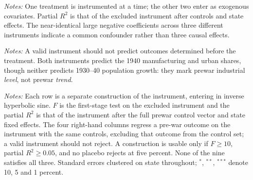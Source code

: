 \documentclass[12pt]{article}
\newcommand{\fittab}[1]{%
  \sbox{\tabbox}{#1}%
  \ifdim\wd\tabbox>\textwidth
    \resizebox{\textwidth}{!}{\usebox{\tabbox}}%
  \else\usebox{\tabbox}\fi}
\begin{document}
\begin{table}[p]
\centering
\caption{Single-endogenous IV estimates against OLS}
\label{tab:iv}
\fittab{}
\vspace{2pt}
\begin{minipage}{\textwidth}\footnotesize \textit{Notes:} One treatment is instrumented at a time; the other two enter as exogenous covariates. Partial $R^2$ is that of the excluded instrument after controls and state effects. The near-identical large negative coefficients across three different instruments indicate a common confounder rather than three causal effects.\end{minipage}
\end{table}

\begin{table}[p]
\centering
\caption{Exclusion-restriction placebo: instruments against pre-war outcomes}
\label{tab:ivplacebo}
\fittab{}
\vspace{2pt}
\begin{minipage}{\textwidth}\footnotesize \textit{Notes:} A valid instrument should not predict outcomes determined before the treatment. Both instruments predict the 1940 manufacturing and urban shares, though neither predicts 1930--40 population growth: they mark prewar industrial \emph{level}, not prewar \emph{trend}.\end{minipage}
\end{table}

\begin{table}[p]
\centering
\caption{Every construction of the 1938 instrument, relevance against exclusion}
\label{tab:impspecs}
\fittab{}
\vspace{2pt}
\begin{minipage}{\textwidth}\footnotesize \textit{Notes:} Each row is a
separate construction of the instrument, entering in inverse hyperbolic sine.
$F$ is the first-stage test on the excluded instrument and the partial $R^2$ is
that of the instrument after the full prewar control vector and state fixed
effects. The four right-hand columns regress a pre-war outcome on the
instrument with the same controls, excluding that outcome from the control set;
a valid instrument should not reject. A construction is usable only if
$F \geq 10$, partial $R^2 \geq 0.05$, and no placebo rejects at five percent.
None of the nine satisfies all three. Standard errors clustered on state
throughout; $^{*}$, $^{**}$, $^{***}$ denote 10, 5 and 1 percent.
\end{minipage}
\end{table}
\end{document}
